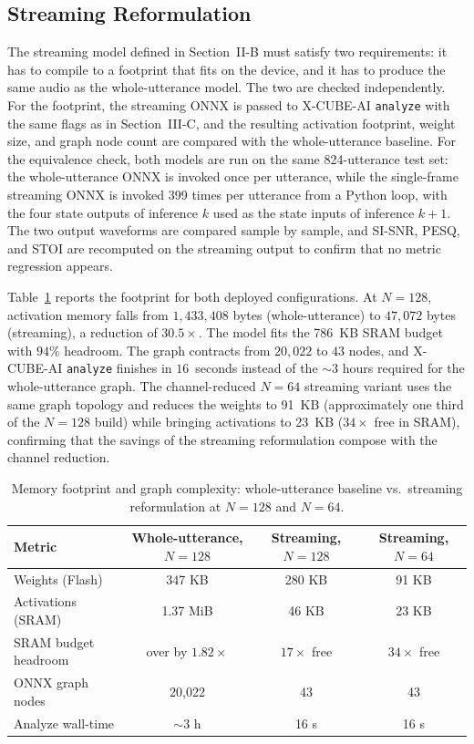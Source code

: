 \documentclass[conference]{IEEEtran}
\begin{document}
\subsection{Streaming Reformulation}
The streaming model defined in Section~II-B must satisfy two requirements: it has to compile to a footprint that fits on the device, and it has to produce the same audio as the whole-utterance model. The two are checked independently. For the footprint, the streaming ONNX is passed to X-CUBE-AI \texttt{analyze} with the same flags as in Section~III-C, and the resulting activation footprint, weight size, and graph node count are compared with the whole-utterance baseline. For the equivalence check, both models are run on the same 824-utterance test set: the whole-utterance ONNX is invoked once per utterance, while the single-frame streaming ONNX is invoked 399 times per utterance from a Python loop, with the four state outputs of inference $k$ used as the state inputs of inference $k+1$. The two output waveforms are compared sample by sample, and SI-SNR, PESQ, and STOI are recomputed on the streaming output to confirm that no metric regression appears.

Table~\ref{tab:mem-compare} reports the footprint for both deployed configurations. At $N=128$, activation memory falls from $1{,}433{,}408$ bytes (whole-utterance) to $47{,}072$ bytes (streaming), a reduction of $30.5\times$. The model fits the 786~KB SRAM budget with $94\%$ headroom. The graph contracts from $20{,}022$ to $43$ nodes, and X-CUBE-AI \texttt{analyze} finishes in $16$~seconds instead of the ${\sim}3$ hours required for the whole-utterance graph. The channel-reduced $N=64$ streaming variant uses the same graph topology and reduces the weights to 91~KB (approximately one third of the $N=128$ build) while bringing activations to 23~KB ($34\times$ free in SRAM), confirming that the savings of the streaming reformulation compose with the channel reduction.

\begin{table}[!t]
\caption{Memory footprint and graph complexity: whole-utterance baseline vs.\ streaming reformulation at $N=128$ and $N=64$.}
\label{tab:mem-compare}
\centering
\begin{tabular}{lccc}
\hline
\textbf{Metric} & \textbf{Whole-utterance, $N{=}128$} & \textbf{Streaming, $N{=}128$} & \textbf{Streaming, $N{=}64$} \\
\hline
Weights (Flash)            & 347 KB              & 280 KB              & 91 KB             \\
Activations (SRAM)         & 1.37 MiB            & 46 KB               & 23 KB             \\
SRAM budget headroom       & over by $1.82\times$ & $17\times$ free     & $34\times$ free   \\
ONNX graph nodes           & 20{,}022            & 43                  & 43                \\
Analyze wall-time          & $\sim\!3$ h         & 16 s                & 16 s              \\
\hline
\end{tabular}
\end{table}
\end{document}
